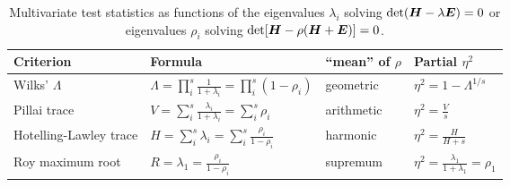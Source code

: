 
\begin{table}[htb]
\renewcommand{\arraystretch}{1.6}
\caption{Multivariate test statistics as functions of the eigenvalues $\lambda_i$ solving $\mathrm{det} (\bm{H} - \lambda \bm{E})=0$
or eigenvalues $\rho_i$ solving  $\mathrm{det} [\bm{H} - \rho (\bm{H}+\bm{E})]=0$.
}\label{tab:criteria}
\begin{center}
\begin{tabular}{|l|l|l|l|}
  \hline
  Criterion & Formula & ``mean'' of $\rho$ & Partial $\eta^2$   \\
  \hline
  Wilks' $\Lambda$ & $\Lambda = \prod^s_i \frac{1}{1+\lambda_i} = \prod^s_i (1-\rho_i)$ & geometric & $\eta^2 = 1-\Lambda^{1/s}$   \\
  Pillai trace & $V = \sum^s_i \frac{\lambda_i}{1+\lambda_i} = \sum^s_i \rho_i$ & arithmetic & $\eta^2 = \frac{V}{s} $   \\
  Hotelling-Lawley trace & $H = \sum^s_i \lambda_i = \sum^s_i \frac{\rho_i}{1-\rho_i} $ & harmonic & $\eta^2 = \frac{H}{H+s}$   \\
  Roy maximum root & $R = \lambda_1 = \frac{\rho_i}{1-\rho_i}$  & supremum & $ \eta^2 = \frac{\lambda_1}{1+\lambda_1} = \rho_1$   \\
  \hline
\end{tabular}
\end{center}
\end{table}
%
